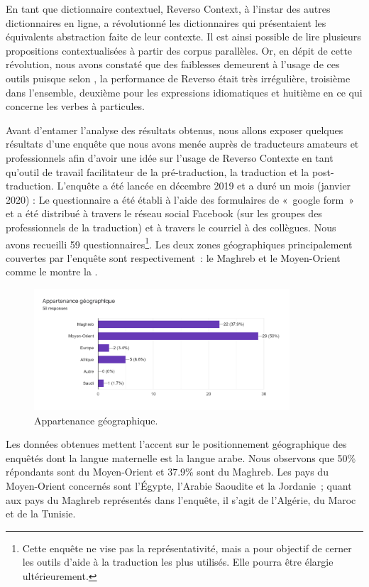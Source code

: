 \documentclass[french,english,brazil]{textolivre}
\begin{document}
En tant que dictionnaire contextuel, Reverso Context, à l’instar des autres dictionnaires en ligne, a révolutionné les dictionnaires qui présentaient les équivalents abstraction faite de leur contexte. Il est ainsi possible de lire plusieurs propositions contextualisées à partir des corpus parallèles. Or, en dépit de cette révolution, nous avons constaté que des faiblesses demeurent à l’usage de ces outils puisque selon \textcite[p. 16]{yen2013}, la performance de Reverso était très irrégulière, troisième dans l’ensemble, deuxième pour les expressions idiomatiques et huitième en ce qui concerne les verbes à particules.

Avant d’entamer l’analyse des résultats obtenus, nous allons exposer quelques résultats d’une enquête que nous avons menée auprès de traducteurs amateurs et professionnels afin d’avoir une idée sur l’usage de Reverso Contexte en tant qu’outil de travail facilitateur de la pré-traduction, la traduction et  la post-traduction. L’enquête a été lancée en décembre 2019 et a duré un mois (janvier 2020) :  Le questionnaire a été établi à l’aide des formulaires de « google form » et a été distribué à travers le réseau social Facebook (sur les groupes des professionnels de la traduction) et à travers le courriel à des collègues. Nous avons recueilli 59 questionnaires\footnote{
Cette enquête ne vise pas la représentativité, mais a pour objectif de cerner les outils d’aide à la traduction les plus utilisés. Elle pourra être élargie ultérieurement.
}. Les deux zones géographiques principalement couvertes par l’enquête sont respectivement : le Maghreb et le Moyen-Orient comme le montre la .

\begin{figure}[htbp]
 \centering
 \includegraphics[width=0.85\textwidth]{figure01.png}
 \caption{Appartenance géographique.}
 \label{fig-01}
\end{figure}

Les données obtenues mettent l’accent sur le positionnement géographique des enquêtés dont la langue maternelle est la langue arabe. Nous observons que 50\% répondants sont du Moyen-Orient et 37.9\% sont du Maghreb. Les pays du Moyen-Orient concernés sont l’Égypte, l’Arabie Saoudite et la Jordanie ; quant aux pays du Maghreb représentés dans l’enquête, il s’agit de l’Algérie, du Maroc et de la Tunisie.
\end{document}
